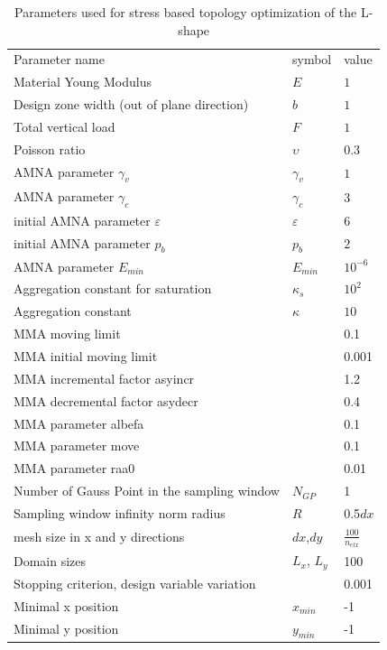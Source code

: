 \begin{table}[h!]
 \caption{Parameters used for stress based topology optimization of the L-shape}
 \label{tab:4}       %
 \centering
 \begin{tabular}{lll}
 \hline\noalign{\smallskip}
 Parameter name & symbol & value \\
 \noalign{\smallskip}\hline\noalign{\smallskip}
 Material Young Modulus & $E$ & $1$\\
 Design zone width (out of plane direction) & $b$ & $1$\\
 Total vertical load & $F$ & $1$\\
 Poisson ratio & $\upsilon$ & $0.3$\\
 AMNA parameter $\gamma_v$ & $\gamma_v$ & $1$\\
 AMNA parameter $\gamma_c$ & $\gamma_c$ & $3$\\
 initial AMNA parameter  $\varepsilon$ & $\varepsilon$ & $6$\\
 initial AMNA parameter $p_b$ & $p_b$ & $2$\\
 AMNA parameter $E_{min}$ & $E_{min}$ & $10^{-6}$\\
 Aggregation constant for saturation & $\kappa_s$ & $10^{2}$\\
 Aggregation constant  & $\kappa$ & $10$\\
 MMA moving limit & & 0.1\\
 MMA initial moving limit & & 0.001\\
 MMA incremental factor asyincr  & & 1.2\\
 MMA decremental factor asydecr & & 0.4\\
 MMA parameter albefa & & 0.1\\
 MMA parameter move & & 0.1\\
 MMA parameter raa0 & & 0.01\\
 Number of Gauss Point in the sampling window & $N_{GP}$ & 1\\
 Sampling window infinity norm radius  & $R$ & 0.5$dx$\\
 mesh size in x and y directions  & $dx$,$dy$ & $\frac{100}{n_{elx}}$\\
 Domain sizes & $L_x$, $L_y$ & 100\\
 Stopping criterion, design variable variation & & 0.001\\
 Minimal x position & $x_{min}$ & -1\\
 Minimal y position & $y_{min}$ & -1\\

\end{tabular}
\end{table}

